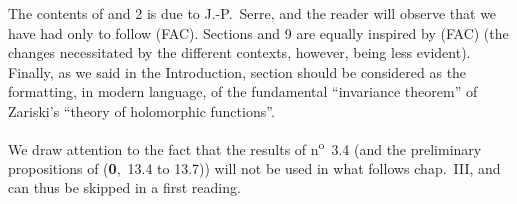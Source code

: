 \documentclass[openany,oneside]{amsbook}
\theoremstyle{ega-env-style}
\theoremstyle{ega-thm-env-style}
\theoremstyle{ega-defn-env-style}
\begin{document}
The contents of \textsection{} and 2 is due to J.-P.~Serre, and the reader will observe that we have had only to follow (FAC).
Sections  and 9 are equally inspired by (FAC) (the changes necessitated by the different contexts, however, being less evident).
Finally, as we said in the Introduction, section  should be considered as the formatting, in modern language, of the fundamental ``invariance theorem'' of Zariski's ``theory of holomorphic functions''.

We draw attention to the fact that the results of n\textsuperscript{o}~3.4 (and the preliminary propositions of (\textbf{0},~13.4 to 13.7)) will not be used in what follows chap.~III, and can thus be skipped in a first reading.

\bigskip













\end{document}
